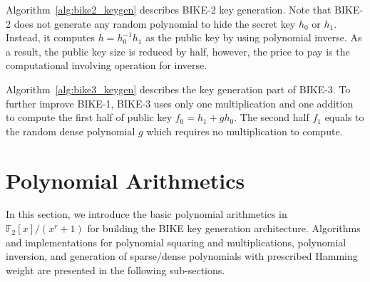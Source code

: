 \documentclass[runningheads]{llncs}
\begin{document}
Algorithm~\ref{alg:bike2_keygen} describes BIKE-2 key generation. Note that BIKE-2 does not generate any random polynomial to hide the secret key $h_0$ or $h_1$. Instead, it computes $h=h_0^{-1}h_1$ as the public key by using polynomial inverse. As a result, the public key size is reduced by half, however, the price to pay is the computational involving operation for inverse.

Algorithm~\ref{alg:bike3_keygen} describes the key generation part of BIKE-3. To further improve BIKE-1, BIKE-3 uses only one multiplication and one addition to compute the first half of public key $f_0=h_1+gh_0$. The second half $f_1$ equals to the random dense polynomial $g$ which requires no multiplication to compute.

\section{Polynomial Arithmetics}
\label{sec::modules}
In this section, we introduce the basic polynomial arithmetics 
in $\mathbb{F}_2[x]/(x^r+1)$
for building the BIKE key generation architecture. 
Algorithms and implementations for
polynomial squaring and multiplications,
polynomial inversion,
and generation of sparse/dense polynomials with prescribed Hamming weight
are presented in the following sub-sections.
\end{document}
